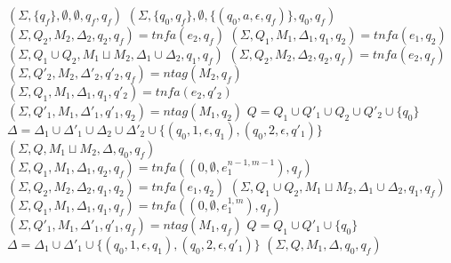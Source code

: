 \documentclass[AMA,STIX1COL]{WileyNJD-v2}
\begin{document}
\begin{algorithm}[] \DontPrintSemicolon {}
\begin{multicols}{2}

    \newcommand \retonfa {tn\!f\!a}
    \newcommand \ntag {ntag}

    \Fn {$\underline{\retonfa(e, q_f)} \smallskip$} {
         {
            \Return $(\Sigma, \{q_f\}, \emptyset, \emptyset, q_f, q_f)$
        }
        \BlankLine
         {
            \Return $(\Sigma, \{q_0,q_f\}, \emptyset, \{(q_0, a, \epsilon, q_f)\}, q_0, q_f)$
        }
        \BlankLine
         {
            $(\Sigma, Q_2, M_2, \Delta_2, q_2, q_f) = \retonfa (e_2, q_f)$ \;
            $(\Sigma, Q_1, M_1, \Delta_1, q_1, q_2) = \retonfa (e_1, q_2)$ \;
            \Return $(\Sigma, Q_1 \cup Q_2, M_1 \sqcup M_2, \Delta_1 \cup \Delta_2, q_1, q_f)$
        }
        \BlankLine
         {
            $(\Sigma, Q_2, M_2, \Delta_2, q_2, q_f) = \retonfa (e_2, q_f)$ \;
            $(\Sigma, Q'_2, M_2, \Delta'_2, q'_2, q_f) = \ntag (M_2, q_f)$ \;
            $(\Sigma, Q_1, M_1, \Delta_1, q_1, q'_2) = \retonfa (e_2, q'_2)$ \;
            $(\Sigma, Q'_1, M_1, \Delta'_1, q'_1, q_2) = \ntag (M_1, q_2)$ \;
            $Q = Q_1 \cup Q'_1 \cup Q_2 \cup Q'_2 \cup \{q_0\}$ \;
            $\Delta = \Delta_1 \cup \Delta'_1 \cup \Delta_2 \cup \Delta'_2 \cup \{ (q_0,1,\epsilon,q_1), (q_0,2,\epsilon,q'_1) \}$ \;
            \Return $(\Sigma, Q, M_1 \sqcup M_2, \Delta, q_0, q_f)$
        }
        \BlankLine
         {
            $(\Sigma, Q_1, M_1, \Delta_1, q_2, q_f) = \retonfa ((0, \emptyset, e_1^{n-1,m-1}), q_f)$ \;
            $(\Sigma, Q_2, M_2, \Delta_2, q_1, q_2) = \retonfa (e_1, q_2)$ \;
            \Return $(\Sigma, Q_1 \cup Q_2, M_1 \sqcup M_2, \Delta_1 \cup \Delta_2, q_1, q_f)$
        }
        \BlankLine
         {
            $(\Sigma, Q_1, M_1, \Delta_1, q_1, q_f) = \retonfa ((0, \emptyset, e_1^{1,m}), q_f)$ \;
            $(\Sigma, Q'_1, M_1, \Delta'_1, q'_1, q_f) = \ntag (M_1, q_f)$ \;
            $Q = Q_1 \cup Q'_1 \cup \{q_0\}$ \;
            $\Delta = \Delta_1 \cup \Delta'_1 \cup \{ (q_0, 1, \epsilon, q_1), (q_0, 2, \epsilon, q'_1) \}$ \;
            \Return $(\Sigma, Q, M_1, \Delta, q_0, q_f)$
        }
        \BlankLine
         {
}}
\end{multicols}
\end{algorithm}
\end{document}
